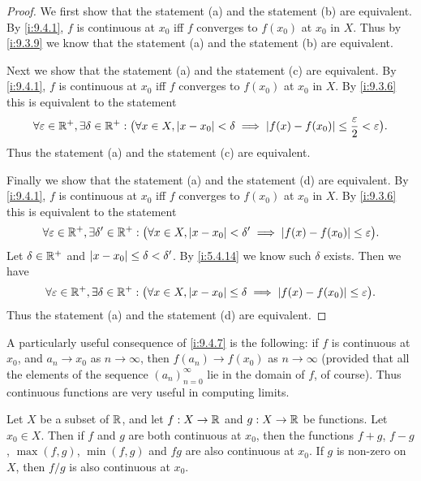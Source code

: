 \begin{proof}
  We first show that the statement (a) and the statement (b) are equivalent.
  By \cref{i:9.4.1}, \(f\) is continuous at \(x_0\) iff \(f\) converges to \(f(x_0)\) at \(x_0\) in \(X\).
  Thus by \cref{i:9.3.9} we know that the statement (a) and the statement (b) are equivalent.

  Next we show that the statement (a) and the statement (c) are equivalent.
  By \cref{i:9.4.1}, \(f\) is continuous at \(x_0\) iff \(f\) converges to \(f(x_0)\) at \(x_0\) in \(X\).
  By \cref{i:9.3.6} this is equivalent to the statement
  \[
    \forall \varepsilon \in \mathbb{R}^+, \exists \delta \in \mathbb{R}^+ : \big(\forall x \in X, \left\lvert x - x_0\right\rvert < \delta \implies \left\lvert f(x) - f(x_0)\right\rvert \leq \dfrac{\varepsilon}{2} < \varepsilon\big).
  \]
  Thus the statement (a) and the statement (c) are equivalent.

  Finally we show that the statement (a) and the statement (d) are equivalent.
  By \cref{i:9.4.1}, \(f\) is continuous at \(x_0\) iff \(f\) converges to \(f(x_0)\) at \(x_0\) in \(X\).
  By \cref{i:9.3.6} this is equivalent to the statement
  \[
    \forall \varepsilon \in \mathbb{R}^+, \exists \delta' \in \mathbb{R}^+ : \big(\forall x \in X, \left\lvert x - x_0\right\rvert < \delta' \implies \left\lvert f(x) - f(x_0)\right\rvert \leq \varepsilon\big).
  \]
  Let \(\delta \in \mathbb{R}^+\) and \(\left\lvert x - x_0\right\rvert \leq \delta < \delta'\).
  By \cref{i:5.4.14} we know such \(\delta\) exists.
  Then we have
  \[
    \forall \varepsilon \in \mathbb{R}^+, \exists \delta \in \mathbb{R}^+ : \big(\forall x \in X, \left\lvert x - x_0\right\rvert \leq \delta \implies \left\lvert f(x) - f(x_0)\right\rvert \leq \varepsilon\big).
  \]
  Thus the statement (a) and the statement (d) are equivalent.
\end{proof}

\begin{rmk}\label{i:9.4.8}
  A particularly useful consequence of \cref{i:9.4.7} is the following:
  if \(f\) is continuous at \(x_0\), and \(a_n \to x_0\) as \(n \to \infty\), then \(f(a_n) \to f(x_0)\) as \(n \to \infty\)
  (provided that all the elements of the sequence \((a_n)_{n = 0}^\infty\) lie in the domain of \(f\), of course).
  Thus continuous functions are very useful in computing limits.
\end{rmk}

\begin{prop}\label{i:9.4.9}
  Let \(X\) be a subset of \(\mathbb{R}\), and let \(f : X \to \mathbb{R}\) and \(g : X \to \mathbb{R}\) be functions.
  Let \(x_0 \in X\).
  Then if \(f\) and \(g\) are both continuous at \(x_0\), then the functions \(f + g\), \(f - g\), \(\max(f, g)\), \(\min(f, g)\) and \(fg\) are also continuous at \(x_0\).
  If \(g\) is non-zero on \(X\), then \(f / g\) is also continuous at \(x_0\).
\end{prop}

